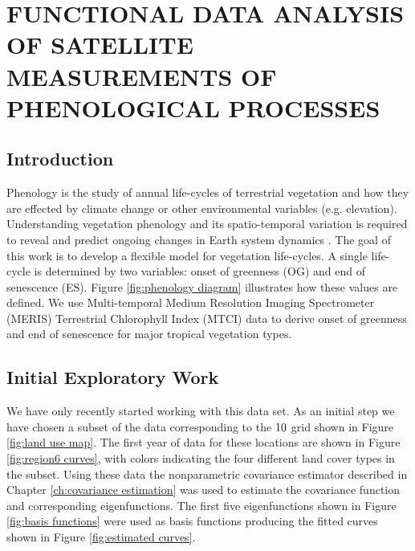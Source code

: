 

\chapter{FUNCTIONAL DATA ANALYSIS OF SATELLITE MEASUREMENTS OF PHENOLOGICAL PROCESSES} \label{future work}

\section{Introduction}

Phenology is the study of annual life-cycles of terrestrial vegetation and how they are effected by climate change or other environmental variables (e.g. elevation). Understanding vegetation phenology and its spatio-temporal variation is required to reveal and predict ongoing changes in Earth system dynamics \cite{Jeganathan:2010:0921-2973:1125}. The goal of this work is to develop a flexible model for vegetation life-cycles. A single life-cycle is determined by two variables: onset of greenness (OG) and end of senescence (ES). Figure \ref{fig:phenology diagram} illustrates how these values are defined. We use Multi-temporal Medium Resolution Imaging Spectrometer (MERIS) Terrestrial Chlorophyll Index (MTCI) data to derive onset of greenness and end of senescence for major tropical vegetation types.

\section{Initial Exploratory Work} We have only recently started working with this data set. As an initial step we have chosen a subset of the data corresponding to the $10\time 10$ grid shown in Figure \ref{fig:land use map}. The first year of data for these locations are shown in Figure \ref{fig:region6 curves}, with colors indicating the four different land cover types in the subset. Using these data the nonparametric covariance estimator described in Chapter \ref{ch:covariance estimation} was used to estimate the covariance function and corresponding eigenfunctions. The first five eigenfunctions shown in Figure \ref{fig:basis functions} were used as basis functions producing the fitted curves shown in Figure \ref{fig:estimated curves}. 

